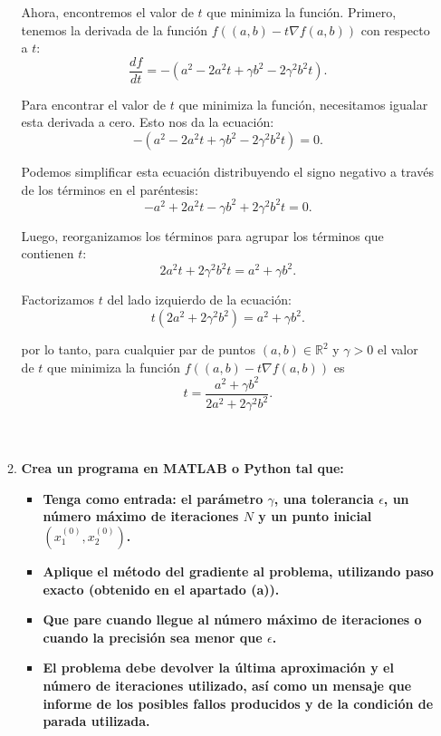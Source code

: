 \begin{enumerate}
\begin{enumerate}[\bfseries (a)]
	    Ahora, encontremos el valor de $t$ que minimiza la función.  Primero, tenemos la derivada de la función $f\left((a,b)-t\nabla f(a,b)\right)$ con respecto a $t$:
	    $$\frac{df}{dt} = -(a^2 - 2a^2t + \gamma b^2 - 2\gamma^2 b^2t).$$

	    Para encontrar el valor de $t$ que minimiza la función, necesitamos igualar esta derivada a cero. Esto nos da la ecuación:
	    $$-(a^2 - 2a^2t + \gamma b^2 - 2\gamma^2 b^2t) = 0.$$

	    Podemos simplificar esta ecuación distribuyendo el signo negativo a través de los términos en el paréntesis:
	    $$-a^2 + 2a^2t - \gamma b^2 + 2\gamma^2 b^2t = 0.$$

	    Luego, reorganizamos los términos para agrupar los términos que contienen $t$:
	    $$2a^2t + 2\gamma^2 b^2t = a^2 + \gamma b^2.$$

	    Factorizamos $t$ del lado izquierdo de la ecuación:
	    $$t(2a^2 + 2\gamma^2 b^2) = a^2 + \gamma b^2.$$

	    por lo tanto, para cualquier par de puntos $(a,b)\in \mathbb{R}^2$ y $\gamma>0$ el valor de $t$ que minimiza la función $f\left((a,b)-t\nabla f(a,b)\right)$ es
	    $$t = \frac{a^2 + \gamma b^2}{2a^2 + 2\gamma^2 b^2}.$$\\\\


	\item \textbf{\boldmath Crea un programa en MATLAB o Python tal que:}

	    \begin{itemize}

		\item \textbf{\boldmath Tenga como entrada: el parámetro $\gamma$, una tolerancia $\epsilon$, un número máximo de iteraciones $N$ y un punto inicial $\left(x_1^{(0)},x_2^{(0)}\right)$.}\\

		\item \textbf{Aplique el método del gradiente al problema, utilizando paso exacto (obtenido en el apartado (a)).}\\

		\item \textbf{\boldmath Que pare cuando llegue al número máximo de iteraciones o cuando la precisión sea menor que $\epsilon$.}\\

		\item \textbf{El problema debe devolver la última aproximación y el número de iteraciones utilizado, así como un mensaje que informe de los posibles fallos producidos y de la condición de parada utilizada.}\\


\end{itemize}
\end{enumerate}
\end{enumerate}
